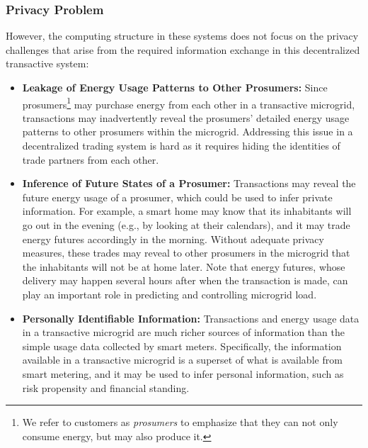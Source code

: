 \documentclass[12pt,letterpaper]{article}
\begin{document}
\subsubsection{Privacy Problem}

However, the computing structure in these systems does not focus on the privacy challenges that arise from the
required information exchange in this decentralized transactive
system: 
\begin{itemize}
\item \textbf{Leakage of Energy Usage Patterns to Other Prosumers:} 
 Since prosumers\footnote{We
  refer to customers as \emph{prosumers} to emphasize that they can
  not only consume energy, but may also produce it.} may purchase
  energy from each other in a transactive microgrid, transactions may
  inadvertently reveal the prosumers' detailed energy usage patterns
  to other prosumers within the microgrid.  Addressing this issue in a
  decentralized trading system is hard as it requires hiding the
  identities of trade partners from each other. %

\item \textbf{Inference of Future States of a Prosumer:} 
  Transactions may reveal
  the future energy usage of a prosumer, which could be used to infer
  private information.  For example, a smart home may know that its
  inhabitants will go out in the evening (e.g., by looking at
  their calendars), and it may trade energy futures accordingly in the
  morning.  Without adequate privacy measures, these trades may reveal
  to other prosumers in the microgrid that the inhabitants will not be
  at home later.  Note that energy
  futures, whose delivery may happen several hours after when the
  transaction is made, can play an important role in predicting and
  controlling microgrid load.  %

\item \textbf{Personally Identifiable Information:} 
  Transactions and energy
  usage data in a transactive microgrid are much richer sources of
  information than the simple usage data collected by smart
  meters.  Specifically, the information available in a
  transactive microgrid is a superset of what is available from smart
  metering, and it may be used to infer personal information, such as
  risk propensity and financial standing.
\end{itemize}
\end{document}
